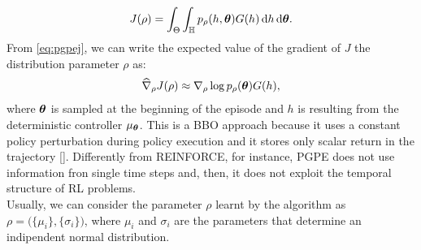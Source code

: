 \begin{align}
J(\rho) = \int_{\Theta} \int_{\mathbb{H}} p_{\rho}(h, \boldsymbol{\theta}) G(h) \,\mathrm{d} h \,\mathrm{d} \boldsymbol{\theta}. \label{eq:pgpej}
\end{align}
From \ref{eq:pgpej}, we can write the expected value of the gradient of $J$ \wrt the distribution parameter $\rho$ as:
\begin{align}
\widehat{\nabla}_{\rho}J(\rho) \approx \nabla_{\rho} \log p_{\rho} (\boldsymbol{\theta}) G(h),
\end{align}
where $\boldsymbol{\theta}$ is sampled at the beginning of the episode and $h$ is resulting from the deterministic controller $\mu_{\boldsymbol{\theta}}$. This is a \acf{BBO} approach because it uses a constant policy perturbation during policy execution and it stores only scalar return in the trajectory [\cite{stulp2012pol}]. Differently from REINFORCE, for instance, \ac{PGPE} does not use information fron single time steps and, then, it does not exploit the temporal structure of \ac{RL} problems.\\
\newline
Usually, we can consider the parameter $\rho$ learnt by the algorithm as $\rho = \Big( \{\mu_i\}, \{\sigma_i\} \Big)$, where $\mu_i$ and $\sigma_i$ are the parameters that determine an indipendent normal distribution.
